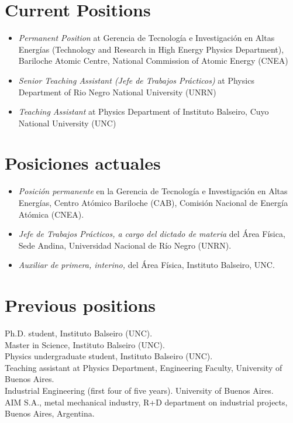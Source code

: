 \ifeng
\section*{Current Positions}
\begin{itemize}
\item \emph{Permanent Position} at Gerencia de Tecnología e Investigación en Altas Energías (Technology and Research in High Energy Physics Department), Bariloche Atomic Centre, National Commission of Atomic Energy (CNEA)
\item \emph{Senior Teaching Assistant (Jefe de Trabajos Prácticos)} at Physics Department of Rio Negro National University (UNRN)
\item \emph{Teaching Assistant} at Physics Department of Instituto Balseiro, Cuyo National University (UNC)
\end{itemize}
\else
\section*{Posiciones actuales}
\begin{itemize}
\item \emph{Posición permanente} en la Gerencia de Tecnología e Investigación en Altas Energías, Centro Atómico Bariloche (CAB), Comisión Nacional de Energía Atómica (CNEA).\\
\item \emph{Jefe de Trabajos Prácticos, a cargo del dictado de materia} del Área Física, Sede Andina, Universidad Nacional de Río Negro (UNRN).\\
\item \emph{Auxiliar de primera, interino,} del Área Física, Instituto Balseiro, UNC.\\
\end{itemize}
\fi

\ifeng
\section*{Previous positions}
\noindent
{}Ph.D. student, Instituto Balseiro (UNC).\\
Master in Science, Instituto Balseiro (UNC).\\
Physics undergraduate student, Instituto Balseiro (UNC).\\
Teaching assistant at Physics Department, Engineering Faculty, University of Buenos Aires.\\
Industrial Engineering (first four of five years). University of Buenos Aires.\\
AIM S.A., metal mechanical industry, R+D department on industrial projects, Buenos Aires, Argentina.\\
\else
